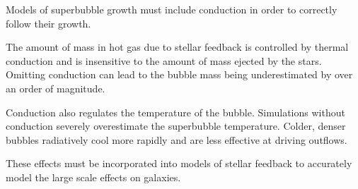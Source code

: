 \documentclass[12pt]{report}
\begin{document}
\Huge
Models of superbubble growth must include conduction in order to
correctly follow their growth.

The amount of mass in hot gas due to stellar feedback is controlled by
thermal conduction and is insensitive to the amount of mass ejected
by the stars.  Omitting conduction can lead to the bubble mass being
underestimated by over an order of magnitude.  

Conduction also regulates the temperature of the bubble.  Simulations without 
conduction severely overestimate the superbubble temperature.  Colder, denser bubbles radiatively cool
more rapidly and are less effective at driving outflows.  

These effects must be incorporated into models of stellar feedback to
accurately model the large scale effects on galaxies.  
\end{document}
